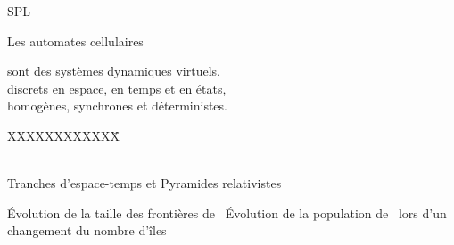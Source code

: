 
\begin{slide}
  \begin{Huge}
    \begin{center}
      SPL
    \end{center}
  \end{Huge}
\end{slide}

\begin{slide}
  \begin{center}
    Les automates cellulaires
  \end{center}
  sont des syst\`emes dynamiques virtuels,\\
  discrets en espace, en temps et en \'etats,\\
  homog\`enes, synchrones et d\'eterministes.
\end{slide}

\begin{slide}
  \begin{tabbing}
    XXXXXXXXXXXX\=\kill
    \>\\
    \>\\
    \>
  \end{tabbing}
\end{slide}

{}
{}

{}
{Tranches d'espace-temps et Pyramides relativistes}



\begin{slide}
  {\'Evolution de la taille des fronti\`eres de~}%
  {\'Evolution de la population de~ lors
    d'un changement du nombre d'\^iles}%
\end{slide}


